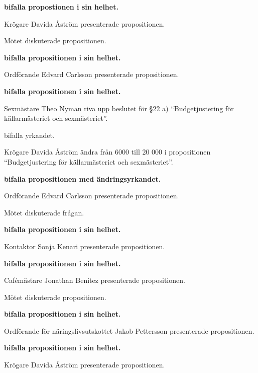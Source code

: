 \documentclass[10pt]{article}
\begin{document}
\begin{paragrafer}
\begin{paragrafer}
      \textbf{\Mba bifalla propostionen i sin helhet.}

      Krögare Davida Åström presenterade propositionen.

      Mötet diskuterade propositionen.

      \textbf{\Mba bifalla propositionen i sin helhet.}

    Ordförande Edvard Carlsson presenterade propositionen. 
        
    \textbf{\Mba bifalla propositionen i sin helhet.}

    Sexmästare Theo Nyman \ypa riva upp beslutet för \S22 a) ``Budgetjustering för källarmästeriet och sexmästeriet''.

    \Mba bifalla yrkandet.

    Krögare Davida Åström \ypa ändra från 6000 till 20 000 i propositionen ``Budgetjustering för källarmästeriet och sexmästeriet''.
    
    \textbf{\Mba bifalla propositionen med ändringsyrkandet.}

      Ordförande Edvard Carlsson presenterade propositionen.

      Mötet diskuterade frågan.

      \textbf{\Mba bifalla propositionen i sin helhet.}

      Kontaktor Sonja Kenari presenterade propositionen.

      \textbf{\Mba bifalla propositionen i sin helhet.}

      Cafémästare Jonathan Benitez presenterade propositionen. 

      Mötet diskuterade propositionen.

      \textbf{\Mba bifalla propositionen i sin helhet.}

      Ordförande för näringslivsutskottet Jakob Pettersson presenterade propositionen.

        \textbf{\Mba bifalla propositionen i sin helhet.}

      Krögare Davida Åström presenterade propositionen.


\end{paragrafer}
\end{paragrafer}
\end{document}

